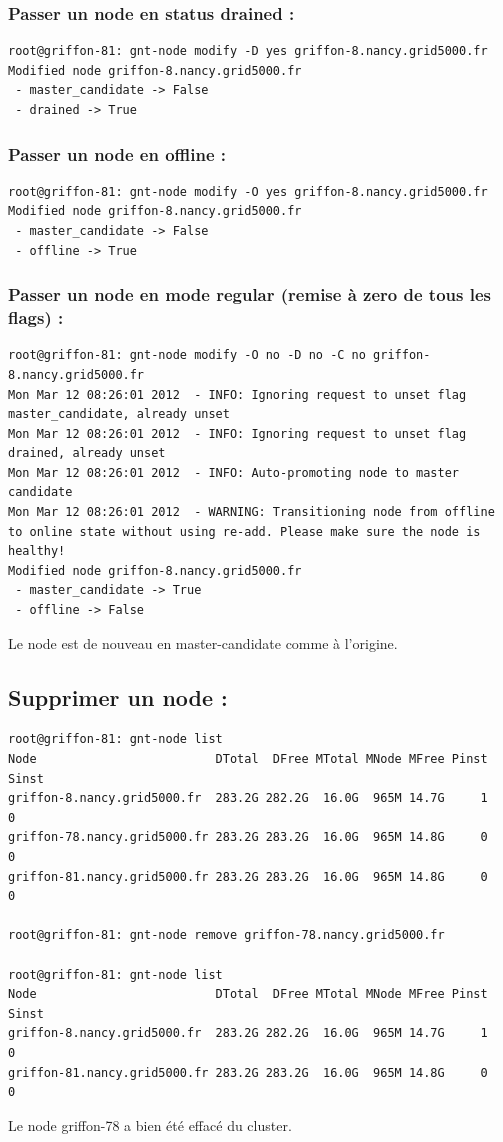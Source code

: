 \subsubsection {Passer un node en status drained :}
\begin{lstlisting}
root@griffon-81: gnt-node modify -D yes griffon-8.nancy.grid5000.fr
Modified node griffon-8.nancy.grid5000.fr
 - master_candidate -> False
 - drained -> True
\end{lstlisting}
\subsubsection {Passer un node en offline :}
\begin{lstlisting}
root@griffon-81: gnt-node modify -O yes griffon-8.nancy.grid5000.fr
Modified node griffon-8.nancy.grid5000.fr
 - master_candidate -> False
 - offline -> True
\end{lstlisting}
\subsubsection {Passer un node en mode regular (remise à zero de tous les flags) :}
\begin{lstlisting}
root@griffon-81: gnt-node modify -O no -D no -C no griffon-8.nancy.grid5000.fr
Mon Mar 12 08:26:01 2012  - INFO: Ignoring request to unset flag master_candidate, already unset
Mon Mar 12 08:26:01 2012  - INFO: Ignoring request to unset flag drained, already unset
Mon Mar 12 08:26:01 2012  - INFO: Auto-promoting node to master candidate
Mon Mar 12 08:26:01 2012  - WARNING: Transitioning node from offline to online state without using re-add. Please make sure the node is healthy!
Modified node griffon-8.nancy.grid5000.fr
 - master_candidate -> True
 - offline -> False
\end{lstlisting}
Le node est de nouveau en master-candidate comme à l'origine.

\subsection {Supprimer un node :}
\begin{lstlisting}
root@griffon-81: gnt-node list
Node                         DTotal  DFree MTotal MNode MFree Pinst Sinst
griffon-8.nancy.grid5000.fr  283.2G 282.2G  16.0G  965M 14.7G     1     0
griffon-78.nancy.grid5000.fr 283.2G 283.2G  16.0G  965M 14.8G     0     0
griffon-81.nancy.grid5000.fr 283.2G 283.2G  16.0G  965M 14.8G     0     0

root@griffon-81: gnt-node remove griffon-78.nancy.grid5000.fr

root@griffon-81: gnt-node list
Node                         DTotal  DFree MTotal MNode MFree Pinst Sinst
griffon-8.nancy.grid5000.fr  283.2G 282.2G  16.0G  965M 14.7G     1     0
griffon-81.nancy.grid5000.fr 283.2G 283.2G  16.0G  965M 14.8G     0     0
\end{lstlisting}
Le node griffon-78 a bien été effacé du cluster.

